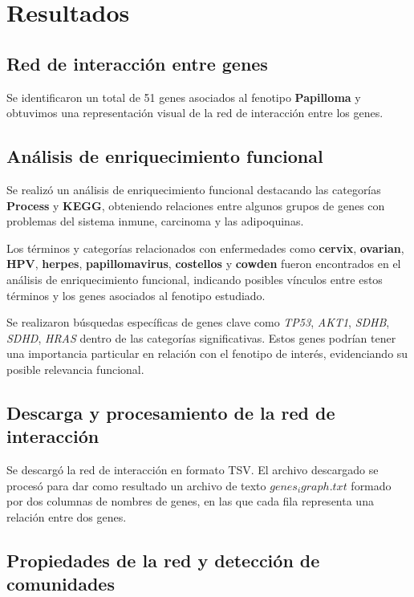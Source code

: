 
\section{Resultados}

\subsection{Red de interacción entre genes}

Se identificaron un total de 51 genes asociados al fenotipo \textbf{Papilloma} y obtuvimos una representación visual de la red de interacción entre los genes.


\subsection{Análisis de enriquecimiento funcional}

Se realizó un análisis de enriquecimiento funcional destacando las categorías \textbf{Process} y \textbf{KEGG}, obteniendo relaciones entre algunos grupos de genes con problemas del sistema inmune, carcinoma y las adipoquinas.

Los términos y categorías relacionados con enfermedades como \textbf{cervix}, \textbf{ovarian}, \textbf{HPV}, \textbf{herpes}, \textbf{papillomavirus}, \textbf{costellos} y \textbf{cowden} fueron encontrados en el análisis de enriquecimiento funcional, indicando posibles vínculos entre estos términos y los genes asociados al fenotipo estudiado.

Se realizaron búsquedas específicas de genes clave como \textit{TP53}, \textit{AKT1}, \textit{SDHB}, \textit{SDHD}, \textit{HRAS} dentro de las categorías significativas. Estos genes podrían tener una importancia particular en relación con el fenotipo de interés, evidenciando su posible relevancia funcional.

\subsection{Descarga y procesamiento de la red de interacción}

Se descargó la red de interacción en formato TSV. El archivo descargado se procesó para dar como resultado un archivo de texto \textbf{$genes_igraph.txt$} formado por dos columnas de nombres de genes, en las que cada fila representa una relación entre dos genes.



\subsection{Propiedades de la red y detección de comunidades}

